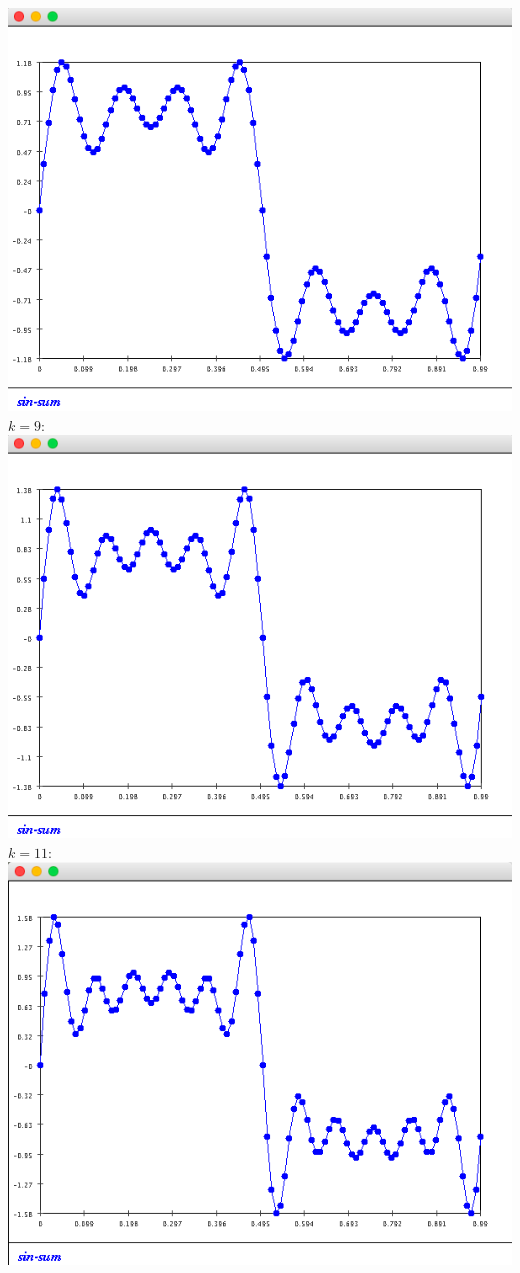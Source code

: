 \documentclass{article}
\begin{document}
\begin{enumerate}
\includegraphics[scale=0.3]{exercise5_k7}\\
$k=9$:\\
\includegraphics[scale=0.3]{exercise5_k9}\\
$k=11$:\\
\includegraphics[scale=0.3]{exercise5_k11}\\


\end{enumerate}
\end{document}
